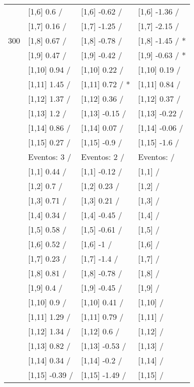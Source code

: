 \begin{table}
\begin{tabular}[t]{llll}
 & {}[1,6] 0.6  / & {}[1,6] -0.62  / & {}[1,6] -1.36  /\\
 & {}[1,7] 0.16  / & {}[1,7] -1.25  / & {}[1,7] -2.15  /\\
300 & {}[1,8] 0.67  / & {}[1,8] -0.78  / & {}[1,8] -1.45  / *\\
\addlinespace
 & {}[1,9] 0.47  / & {}[1,9] -0.42  / & {}[1,9] -0.63  / *\\
 & {}[1,10] 0.94  / & {}[1,10] 0.22  / & {}[1,10] 0.19  /\\
 & {}[1,11] 1.45  / & {}[1,11] 0.72  / * & {}[1,11] 0.84  /\\
 & {}[1,12] 1.37  / & {}[1,12] 0.36  / & {}[1,12] 0.37  /\\
 & {}[1,13] 1.2  / & {}[1,13] -0.15  / & {}[1,13] -0.22  /\\
\addlinespace
 & {}[1,14] 0.86  / & {}[1,14] 0.07  / & {}[1,14] -0.06  /\\
 & {}[1,15] 0.27  / & {}[1,15] -0.9  / & {}[1,15] -1.6  /\\
 & Eventos:  3 / & Eventos:  2 / & Eventos:   /\\
 & {}[1,1] 0.44  / & {}[1,1] -0.12  / & {}[1,1]  /\\
 & {}[1,2] 0.7  / & {}[1,2] 0.23  / & {}[1,2]  /\\
\addlinespace
 & {}[1,3] 0.71  / & {}[1,3] 0.21  / & {}[1,3]  /\\
 & {}[1,4] 0.34  / & {}[1,4] -0.45  / & {}[1,4]  /\\
 & {}[1,5] 0.58  / & {}[1,5] -0.61  / & {}[1,5]  /\\
 & {}[1,6] 0.52  / & {}[1,6] -1  / & {}[1,6]  /\\
 & {}[1,7] 0.23  / & {}[1,7] -1.4  / & {}[1,7]  /\\
\addlinespace
500 & {}[1,8] 0.81  / & {}[1,8] -0.78  / & {}[1,8]  /\\
 & {}[1,9] 0.4  / & {}[1,9] -0.45  / & {}[1,9]  /\\
 & {}[1,10] 0.9  / & {}[1,10] 0.41  / & {}[1,10]  /\\
 & {}[1,11] 1.29  / & {}[1,11] 0.79  / & {}[1,11]  /\\
 & {}[1,12] 1.34  / & {}[1,12] 0.6  / & {}[1,12]  /\\
\addlinespace
 & {}[1,13] 0.82  / & {}[1,13] -0.53  / & {}[1,13]  /\\
 & {}[1,14] 0.34  / & {}[1,14] -0.2  / & {}[1,14]  /\\
 & {}[1,15] -0.39  / & {}[1,15] -1.49  / & {}[1,15]  /\\
\bottomrule
\end{tabular}
\end{table}
